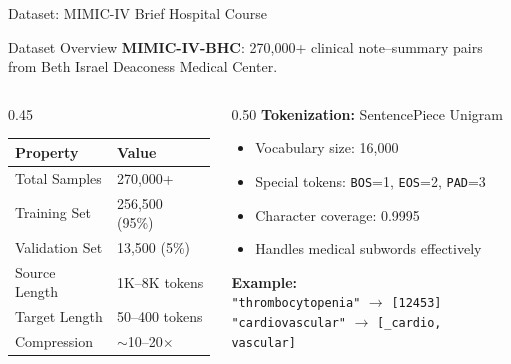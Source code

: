 \documentclass[10pt, aspectratio=169]{beamer}
\begin{document}
\begin{frame}{Dataset: MIMIC-IV Brief Hospital Course}
  \begin{block}{Dataset Overview}
    \textbf{MIMIC-IV-BHC}: 270,000+ clinical note--summary pairs from Beth Israel Deaconess Medical Center.
  \end{block}

  \vspace{0.2cm}

  \begin{columns}[T]
    \begin{column}{0.45\textwidth}
      \begin{table}
        \centering
        \small
        \begin{tabular}{ll}
          \toprule
          \textbf{Property} & \textbf{Value} \\
          \midrule
          Total Samples & 270,000+ \\
          Training Set & 256,500 (95\%) \\
          Validation Set & 13,500 (5\%) \\
          Source Length & 1K--8K tokens \\
          Target Length & 50--400 tokens \\
          Compression & $\sim$10--20$\times$ \\
          \bottomrule
        \end{tabular}
      \end{table}
    \end{column}
    \begin{column}{0.50\textwidth}
      \textbf{Tokenization:} SentencePiece Unigram
      \begin{itemize}
        \item Vocabulary size: 16,000
        \item Special tokens: \texttt{BOS}=1, \texttt{EOS}=2, \texttt{PAD}=3
        \item Character coverage: 0.9995
        \item Handles medical subwords effectively
      \end{itemize}
      \vspace{0.2cm}
      \textbf{Example:}\\
      {\scriptsize\texttt{"thrombocytopenia"} $\rightarrow$ \texttt{[12453]}}\\
      {\scriptsize\texttt{"cardiovascular"} $\rightarrow$ \texttt{[\_cardio, vascular]}}
    \end{column}
  \end{columns}
\end{frame}
\end{document}
